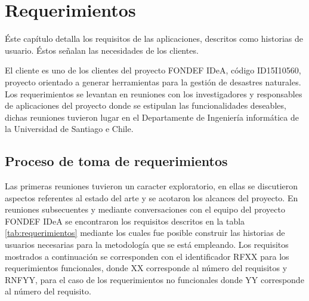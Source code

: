 \chapter{Requerimientos}
\label{cap:Requerimientos}

Éste capítulo detalla los requisitos de las aplicaciones, descritos como historias de usuario. Éstos señalan las necesidades de los clientes.

El cliente es uno de los clientes del proyecto FONDEF IDeA, código ID15I10560, proyecto orientado a generar herramientas para la gestión de desastres naturales. Los requerimientos se levantan en reuniones con los investigadores y responsables de aplicaciones del proyecto donde se estipulan las funcionalidades deseables, dichas reuniones tuvieron lugar en el Departamente de Ingeniería informática de la Universidad de Santiago e Chile.

\section{Proceso de toma de requerimientos}
\label{sec:tomaDeRequerimientos}

Las primeras reuniones tuvieron un caracter exploratorio, en ellas se discutieron aspectos referentes al estado del arte y se acotaron los alcances del proyecto. En reuniones subsecuentes y mediante conversaciones con el equipo del proyecto FONDEF IDeA se encontraron los requisitos descritos en la tabla \ref{tab:requerimientos} mediante los cuales fue posible construir las historias de usuarios necesarias para la metodología que se está empleando. Los requisitos mostrados a continuación se corresponden con el identificador RFXX para los requerimientos funcionales, donde XX corresponde al número del requisitos y RNFYY, para el caso de los requerimientos no funcionales donde YY corresponde al número del requisito.

